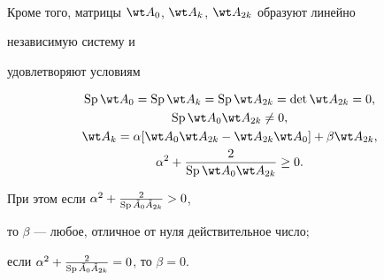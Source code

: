 \begin{thm}
\begin{align*}
\end{align*} 


Кроме того, матрицы $\wt A_0$, $\wt A_k$, $\wt A_{2k}$ образуют линейно 


независимую систему и 


удовлетворяют условиям 


\begin{gather*} 


\SP\wt A_0=\SP\wt A_k=\SP\wt A_{2k}=\det\wt A_{2k}=0,\\ 


\SP\wt A_0\wt A_{2k}\ne0,\\


\wt A_k=\alpha[\wt A_0\wt A_{2k}-\wt A_{2k}\wt A_0]+\beta\wt A_{2k},\\ 


\alpha^2+\frac{2}{\SP\wt A_0\wt A_{2k}}\ge0. 


\end{gather*} 


При этом если $\alpha^2+\frac{2}{\operatorname{Sp}\Tilde A_0\Tilde A_{2k}}>0$, 


то $\beta$ --- любое, отличное от нуля действительное число\/$;$


если $\alpha^2+\frac{2}{\operatorname{Sp}\Tilde A_0\Tilde A_{2k}}=0$, то $\beta=0$. 


\end{thm} 


 


 


